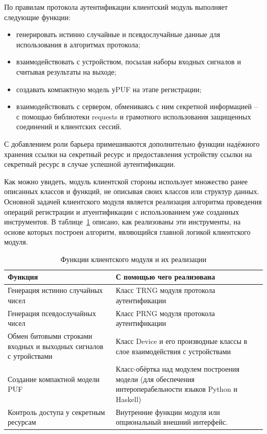 По правилам протокола аутентификации клиентский модуль выполняет следующие функции:
\begin{itemize}
  \item генерировать истинно случайные и псевдослучайные данные для использования в алгоритмах протокола;
  \item взаимодействовать с устройством, посылая наборы входных сигналов и считывая результаты на выходе;
  \item создавать компактную модель уPUF на этапе регистрации;
  \item взаимодействовать с сервером, обмениваясь с ним секретной информацией -- с помощью библиотеки requests и грамотного использования защищенных соединений  и клиентских сессий.
\end{itemize}

С добавлением роли барьера примешиваются дополнительно функции надёжного хранения ссылки на секретный ресурс и предоставления устройству ссылки на секретный ресурс  в случае успешной аутентификации.

Как можно увидеть, модуль клиентской стороны использует множество ранее описанных классов и функций, не описывая своих классов или структур данных. Основной задачей клиентского модуля является реализация алгоритма проведения операций регистрации и атуентификации с использованием уже созданных инструментов. В таблице~\ref{table:architecture:client_funcs} описано, как реализованы эти инструменты, на основе которых построен алгоритм, являющийся главной логикой клиентского модуля.

\begin{table}[ht]
  \caption{Функции клиентского модуля и их реализации}
  \label{table:architecture:client_funcs}
  \begin{tabular}{| >{\raggedright}m{}
                  | >{\raggedright\arraybackslash}m{}|}
   \hline
   Функция & С помощью чего реализована
   \\ \hline
   Генерация истинно случайных чисел & Класс TRNG модуля протокола аутентификации
   \\ \hline
   Генерация псевдослучайных чисел & Класс PRNG модуля протокола аутентификации
   \\ \hline
   Обмен битовыми строками входных и выходных сигналов с утройствами & Класс Device и его производные классы в слое взаимодействия с устройствами
   \\ \hline
   Создание компактной модели PUF & Класс-обёртка над модулем построения модели (для обеспечения интероперабельности языков Python и Haskell)
   \\ \hline
   Контроль доступа у секретным ресурсам & Внутренние функции модуля или опциональный внешний интерфейс.
   \\ \hline
  \end{tabular}
\end{table}

